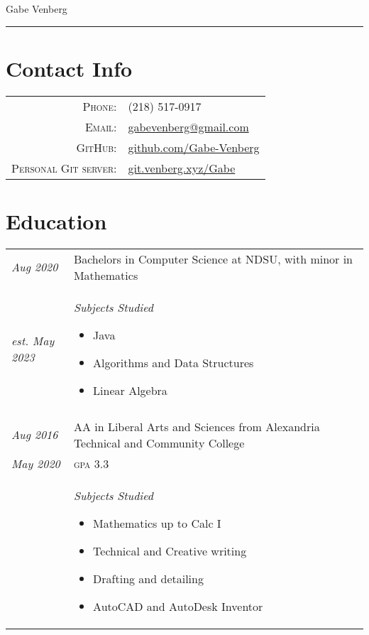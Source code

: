 \documentclass[letterpaper,10pt]{article}
\begin{document}
\pagestyle{empty}%
	\par{\centering
		{\huge Gabe Venberg
	}\bigskip\par}
\hrule
\section*{Contact Info}
	\begin{tabular}{rl}
	\textsc{Phone:} & (218) 517-0917\\
	\textsc{Email:} & \href{mailto:gabevenberg@gmail.com}{gabevenberg@gmail.com}\\
	\textsc{GitHub:} & \href{https://github.com/Gabe-Venberg}{github.com/Gabe-Venberg}\\
	\textsc{Personal Git server:} & \href{https://git.venberg.xyz/Gabe}{git.venberg.xyz/Gabe}\\
	\end{tabular}
\section*{Education}
	\begin{tabular}{R{2cm}|p{14cm}}
	\textsl{Aug 2020} & Bachelors in Computer Science at NDSU, with minor in Mathematics\\
	\textsl{est. May 2023} & \textsl{Subjects Studied}
	\begin{itemize}[noitemsep]
		\item Java
		\item Algorithms and Data Structures
		\item Linear Algebra
	\end{itemize}\\
	\\
	\textsl{Aug 2016} & AA in Liberal Arts and Sciences from Alexandria Technical and Community College\\
	\textsl{May 2020} & \textsc{gpa} 3.3\\
	&\textsl{Subjects Studied}
	\begin{itemize}[noitemsep]
		\item Mathematics up to Calc I
		\item Technical and Creative writing
		\item Drafting and detailing
		\item AutoCAD and AutoDesk Inventor
	\end{itemize}
	\end{tabular}
\end{document}
